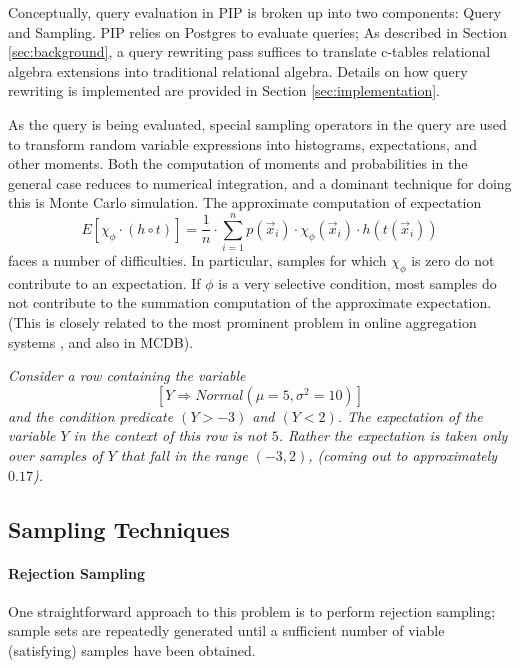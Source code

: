 Conceptually, query evaluation in PIP is broken up into two components: Query and Sampling.  PIP relies on Postgres to evaluate queries; As described in Section \ref{sec:background}, a query rewriting pass suffices to translate c-tables relational algebra extensions into traditional relational algebra.  Details on how query rewriting is implemented are provided in Section \ref{sec:implementation}.  

As the query is being evaluated, special sampling operators in the query are used to transform random variable expressions into histograms, expectations, and other moments.  Both the computation of moments and probabilities in the general case reduces to numerical integration, and a dominant technique for doing this is Monte Carlo simulation. The approximate computation of expectation
\begin{equation}
E[\chi_\phi \cdot (h \circ t)] =
\frac{1}{n} \cdot \sum_{i=1}^n p(\vec{x}_i) \cdot \chi_\phi(\vec{x}_i) \cdot
h(t(\vec{x}_i))
\end{equation}
faces a number of difficulties.  In particular, samples for which $\chi_{\phi}$ is zero do not contribute to an expectation.  If $\phi$ is a very selective condition, most samples do not contribute to the summation computation of the approximate expectation.  (This is closely related to the most prominent problem in online aggregation systems \cite{OnlineAggregation,DBO}, and also in MCDB).

\begin{example}\em 
Consider a row containing the variable 
$$[Y \Rightarrow Normal(\mu=5,\sigma^2=10)]$$
and the condition predicate $(Y > -3)$ and $(Y < 2)$.  The expectation of the variable $Y$ in the context of this row is not $5$.  Rather the expectation is taken only over samples of $Y$ that fall in the range $(-3,2)$, (coming out to approximately $0.17$).  
\end{example}

\subsection{Sampling Techniques}
\label{subsec:samplingTechs}

\paragraph{Rejection Sampling}
One straightforward approach to this problem is to perform rejection sampling; sample sets are repeatedly generated until a sufficient number of viable (satisfying) samples have been obtained.  %

